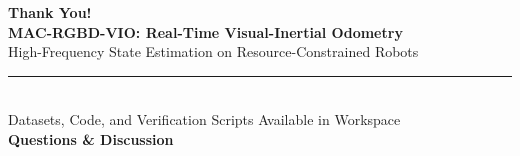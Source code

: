 \documentclass[aspectratio=169, 10pt]{beamer}
\begin{document}
\begin{frame}[plain]
  \vspace{1.5cm}
  \begin{center}
    {\Huge \textbf{\textcolor{NavyBlue}{Thank You!}}}\\[0.8cm]
    {\Large \textbf{MAC-RGBD-VIO: Real-Time Visual-Inertial Odometry}}\\[0.25cm]
    {\normalsize High-Frequency State Estimation on Resource-Constrained Robots}\\[0.6cm]
    {\color{LightLine}\rule{0.4\linewidth}{0.8pt}}\\[0.6cm]
    {\normalsize Datasets, Code, and Verification Scripts Available in Workspace}\\[0.3cm]
    {\small \textbf{Questions \& Discussion}}
  \end{center}
\end{frame}
\end{document}
